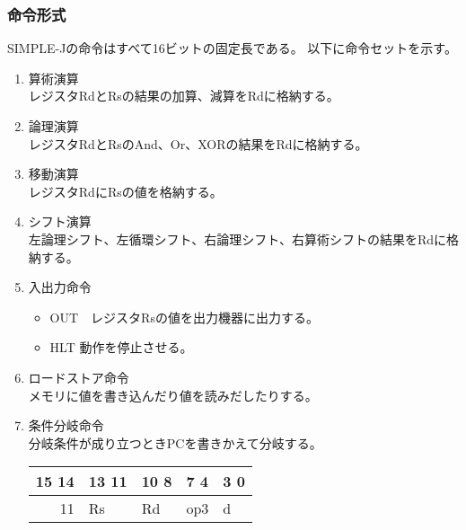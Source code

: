 \documentclass{jarticle}
\begin{document}
\subsubsection{命令形式}
\label{sec-1-4-1}
SIMPLE-Jの命令はすべて16ビットの固定長である。
以下に命令セットを示す。
\begin{enumerate}
\item 算術演算\\
\label{sec-1-4-1-1}
レジスタRdとRsの結果の加算、減算をRdに格納する。
\item 論理演算\\
\label{sec-1-4-1-2}
レジスタRdとRsのAnd、Or、XORの結果をRdに格納する。
\item 移動演算\\
\label{sec-1-4-1-3}
レジスタRdにRsの値を格納する。
\item シフト演算\\
\label{sec-1-4-1-4}
左論理シフト、左循環シフト、右論理シフト、右算術シフトの結果をRdに格納する。
\item 入出力命令\\
\label{sec-1-4-1-5}
\begin{itemize}
\item OUT　レジスタRsの値を出力機器に出力する。
\item HLT 動作を停止させる。
\end{itemize}
\item ロードストア命令\\
\label{sec-1-4-1-6}
メモリに値を書き込んだり値を読みだしたりする。
\item 条件分岐命令\\
\label{sec-1-4-1-7}
分岐条件が成り立つときPCを書きかえて分岐する。
\begin{center}
\begin{tabular}{rllll}
\hline
15   14 & 13  11 & 10  8 & 7    4 & 3  0\\
\hline
11 & Rs & Rd & op3 & d\\
\hline
\end{tabular}
\end{center}


\end{enumerate}
\end{document}

